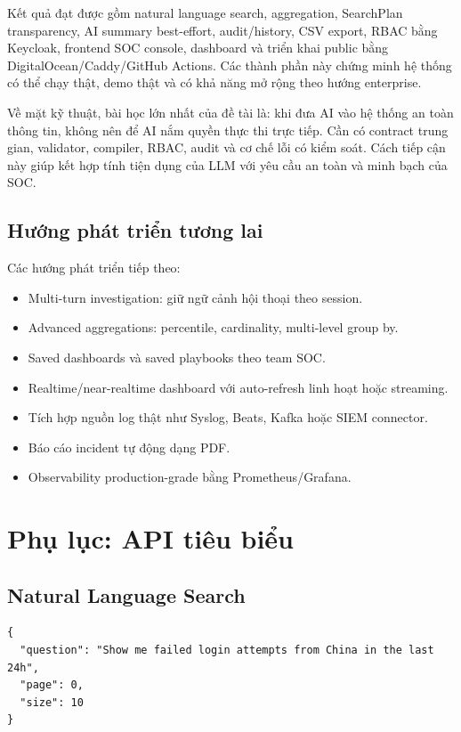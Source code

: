 \documentclass[12pt,a4paper]{report}
\begin{document}
Kết quả đạt được gồm natural language search, aggregation, SearchPlan transparency, AI summary best-effort, audit/history, CSV export, RBAC bằng Keycloak, frontend SOC console, dashboard và triển khai public bằng DigitalOcean/Caddy/GitHub Actions. Các thành phần này chứng minh hệ thống có thể chạy thật, demo thật và có khả năng mở rộng theo hướng enterprise.

Về mặt kỹ thuật, bài học lớn nhất của đề tài là: khi đưa AI vào hệ thống an toàn thông tin, không nên để AI nắm quyền thực thi trực tiếp. Cần có contract trung gian, validator, compiler, RBAC, audit và cơ chế lỗi có kiểm soát. Cách tiếp cận này giúp kết hợp tính tiện dụng của LLM với yêu cầu an toàn và minh bạch của SOC.

\section*{Hướng phát triển tương lai}

Các hướng phát triển tiếp theo:

\begin{itemize}
    \item Multi-turn investigation: giữ ngữ cảnh hội thoại theo session.
    \item Advanced aggregations: percentile, cardinality, multi-level group by.
    \item Saved dashboards và saved playbooks theo team SOC.
    \item Realtime/near-realtime dashboard với auto-refresh linh hoạt hoặc streaming.
    \item Tích hợp nguồn log thật như Syslog, Beats, Kafka hoặc SIEM connector.
    \item Báo cáo incident tự động dạng PDF.
    \item Observability production-grade bằng Prometheus/Grafana.
\end{itemize}

\appendix

\chapter{Phụ lục: API tiêu biểu}

\section{Natural Language Search}

\begin{lstlisting}[caption={Request POST /api/v1/search}]
{
  "question": "Show me failed login attempts from China in the last 24h",
  "page": 0,
  "size": 10
}
\end{lstlisting}
\end{document}
